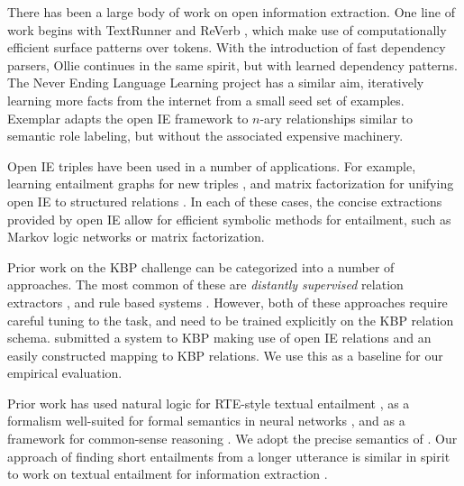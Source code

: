 There has been a large body of work on open information extraction.
One line of work begins with
  TextRunner \cite{key:2007yates-textrunner} and
  ReVerb \cite{key:2011fader-reverb}, which make use of computationally
  efficient surface patterns over tokens.
With the introduction of fast dependency parsers,
  Ollie \cite{key:2012mausam-ollie} continues in the same spirit, but with
  learned dependency patterns.
The Never Ending Language Learning project \cite{key:2010carlson-nell}
  has a similar aim, iteratively learning more facts from the internet
  from a small seed set of examples.
Exemplar \cite{key:2013mesquita-exemplar} adapts the open IE framework to
  $n$-ary relationships similar to semantic role labeling, but without the
  associated expensive machinery.

Open IE triples have been used in a number of applications.
For example, learning entailment graphs for new triples
  \cite{key:2011berant-entailment}, and
  matrix factorization for unifying open IE to structured relations
  \cite{key:2012yao-schemas,key:2013riedel-schemas}.
In each of these cases, the concise extractions provided by open IE allow
  for efficient symbolic methods for entailment, such as Markov logic
  networks or matrix factorization.

Prior work on the KBP challenge can be categorized into a number of approaches.
The most common of these are \textit{distantly supervised} relation extractors
  \cite{key:1999craven-distsup,key:2007wu-distsup,key:2009mintz-distsup,key:2011sun-kbp},
  and rule based systems
  \cite{key:1997soderland-kbp,key:2010grishman-kbp,key:2010chen-kbp}.
However, both of these approaches require careful tuning to the task, and
  need to be trained explicitly on the KBP relation schema.
 submitted a system to KBP making use of
  open IE relations and an easily constructed mapping to KBP relations.
We use this as a baseline for our empirical evaluation.

Prior work has used natural logic \cite{key:2008vanbenthem-natlog} 
  for RTE-style textual entailment \cite{key:2009maccartney-natlog}, as
  a formalism well-suited for formal semantics in neural networks
  \cite{key:2013bowman-natlog}, and as a framework for common-sense reasoning
  \cite{key:2013angeli-truth}.
We adopt the precise semantics of .
Our approach of finding short entailments from a longer utterance is similar
  in spirit to work on textual entailment for information extraction
  \cite{key:2006romano-ie}.

